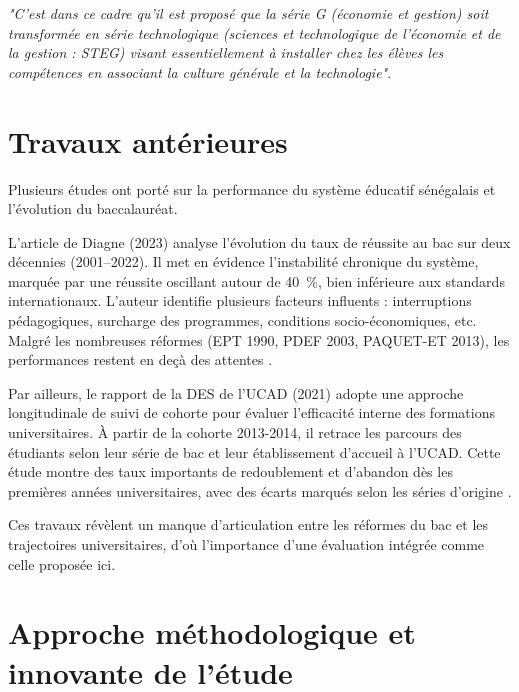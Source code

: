 \textit{"C'est dans ce cadre qu'il est proposé que la série G (économie et gestion) soit transformée en série technologique (sciences et technologique de l'économie et de la gestion : STEG)
visant essentiellement à installer chez les élèves les compétences en associant la culture générale et la technologie"}\cite{decret2019}.

\section{Travaux antérieures }

Plusieurs études ont porté sur la performance du système éducatif sénégalais et l’évolution du baccalauréat.

L’article de Diagne (2023) analyse l’évolution du taux de réussite au bac sur deux décennies (2001–2022). 
Il met en évidence l’instabilité chronique du système, marquée par une réussite oscillant autour de 40~\%, bien inférieure aux standards internationaux. 
L’auteur identifie plusieurs facteurs influents : interruptions pédagogiques, surcharge des programmes, conditions socio-économiques, etc. 
Malgré les nombreuses réformes (EPT 1990, PDEF 2003, PAQUET-ET 2013), les performances restent en deçà des attentes \cite{Mbaye2023}.

Par ailleurs, le rapport de la DES de l’UCAD (2021) adopte une approche longitudinale de suivi de cohorte pour évaluer l’efficacité interne des formations universitaires. 
À partir de la cohorte 2013-2014, il retrace les parcours des étudiants selon leur série de bac et leur établissement d’accueil à l’UCAD. 
Cette étude montre des taux importants de redoublement et d’abandon dès les premières années universitaires, avec des écarts marqués selon les séries d’origine \cite{des2021}.

Ces travaux révèlent un manque d’articulation entre les réformes du bac et les trajectoires universitaires, d’où l’importance d’une évaluation intégrée comme celle proposée ici.

\section{Approche méthodologique et innovante de l'étude}


